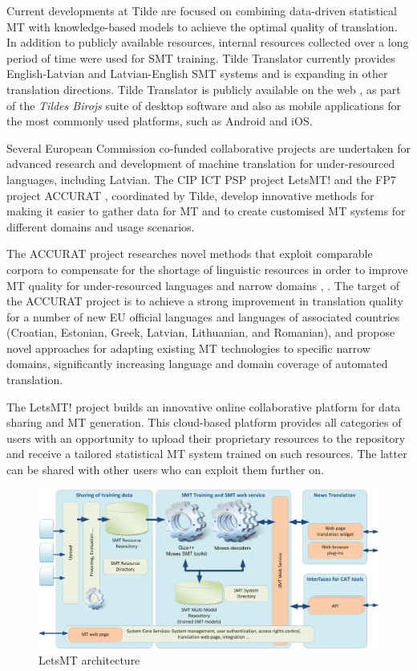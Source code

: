 \begin{multicols}{2}
Current developments at Tilde are focused on combining data-driven statistical MT with knowledge-based models to achieve the optimal quality of translation.
In addition to publicly available resources, internal resources collected over a long period of time were used for SMT training.
Tilde Translator currently provides English-Latvian and Latvian-English SMT systems and is expanding in other translation directions.
Tilde Translator is publicly available on the web \cite{Meta28} \cite{Meta29}, as part of the \textit{Tildes Birojs} suite of desktop software and also as mobile applications for the most commonly used platforms, such as Android and iOS.

Several European Commission co-funded collaborative projects are undertaken for advanced research and development of machine translation for under-resourced languages, including Latvian.
The CIP ICT PSP project LetsMT! \cite{Meta30} and the FP7 project ACCURAT \cite{Meta31}, coordinated by Tilde, develop innovative methods for making it easier to gather data for MT and to create customised MT systems for different domains and usage scenarios.

The ACCURAT project researches novel methods that exploit comparable corpora to compensate for the shortage of linguistic resources in order to improve MT quality for under-resourced languages and narrow domains \cite{Meta32}, \cite{Meta33}.
The target of the ACCURAT project is to achieve a strong improvement in translation quality for a number of new EU official languages and languages of associated countries (Croatian, Estonian, Greek, Latvian, Lithuanian, and Romanian), and propose novel approaches for adapting existing MT technologies to specific narrow domains, significantly increasing language and domain coverage of automated translation.

The LetsMT! project \cite{Meta34} builds an innovative online collaborative platform for data sharing and MT generation.
This cloud-based platform provides all categories of users with an opportunity to upload their proprietary resources to the repository and receive a tailored statistical MT system trained on such resources.
The latter can be shared with other users who can exploit them further on.

\begin{figure}[htb]
  \center
  \includegraphics[width=\textwidth]{../_media/latvian/LetsMT_architecture_EN}
  \caption{LetsMT architecture}
  \label{fig:LetsMT_architecture_EN}
\end{figure}


\end{multicols}
